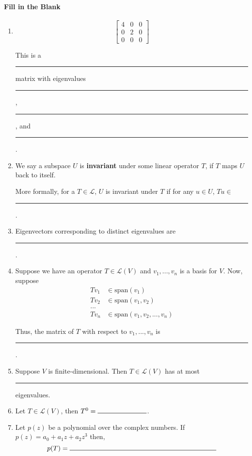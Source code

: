 \documentclass{article}
\newcommand{\spn}[1]{\text{span}\left(#1\right)}
\newcommand{\blank}[1]{\rule[0ex]{#1in}{0.5pt}}
\begin{document}
\paragraph{Fill in the Blank}
\begin{enumerate}
    \item
\[\begin{bmatrix}
    4 & 0 & 0 \\
    0 & 2 & 0 \\
    0 & 0 & 0
\end{bmatrix} \]

This is a \blank{1.5} matrix with eigenvalues
\blank{0.5}, \blank{0.5}, and \blank{0.5}.

\item We say a subspace $U$ is \textbf{invariant} under some linear operator $T$, if $T$ maps $U$ back to itself.

More formally, for a $T \in \mathcal{L}$, $U$ is invariant under $T$ if for any $u \in U$, $Tu \in $ \blank{0.5}.

\item Eigenvectors corresponding to distinct eigenvalues are \blank{1}.

\item Suppose we have an operator $T \in \mathcal{L}(V)$ and $v_1, ..., v_n$ is a basis for $V$. Now, suppose
\[\begin{aligned}
    Tv_1 &\in \spn{v_1} \\
    Tv_2 &\in \spn{v_1, v_2} \\
    ... \\
    Tv_n &\in \spn{v_1, v_2, ..., v_n}
\end{aligned}\]

Thus, the matrix of $T$ with respect to $v_1, ..., v_n$ is \blank{2}.

\item Suppose $V$ is finite-dimensional. Then $T \in \mathcal{L}(V)$ has at most \blank{1} eigenvalues. 

\item Let $T \in \mathcal{L}(V)$, then $T^0 = \blank{1}$.

\item Let $p(z)$ be a polynomial over the complex numbers. If
$p(z) = a_0 + a_1z + a_2z^3$ then,
\[ p(T) = \blank{3} \]

\end{enumerate}
\end{document}
